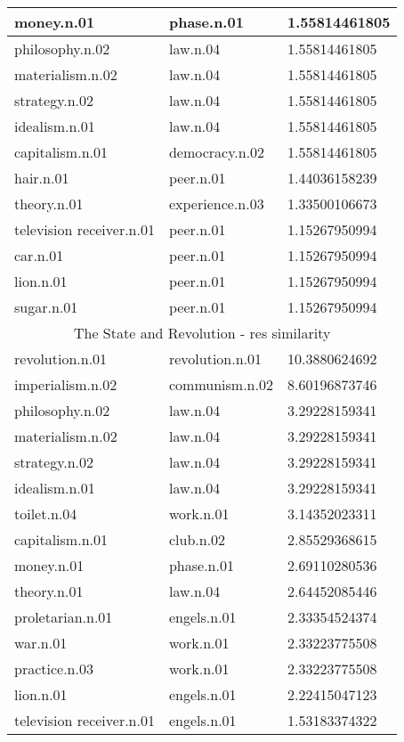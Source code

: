 \begin{center}
\begin{tabular}{ | l | l | l |}
money.n.01 & phase.n.01 & 1.55814461805 \\ \hline
philosophy.n.02 & law.n.04 & 1.55814461805 \\ \hline
materialism.n.02 & law.n.04 & 1.55814461805 \\ \hline
strategy.n.02 & law.n.04 & 1.55814461805 \\ \hline
idealism.n.01 & law.n.04 & 1.55814461805 \\ \hline
capitalism.n.01 & democracy.n.02 & 1.55814461805 \\ \hline
hair.n.01 & peer.n.01 & 1.44036158239 \\ \hline
theory.n.01 & experience.n.03 & 1.33500106673 \\ \hline
television receiver.n.01 & peer.n.01 & 1.15267950994 \\ \hline
car.n.01 & peer.n.01 & 1.15267950994 \\ \hline
lion.n.01 & peer.n.01 & 1.15267950994 \\ \hline
sugar.n.01 & peer.n.01 & 1.15267950994 \\ \hline
\multicolumn{3}{|c|}{The State and Revolution - res similarity} \\ \hline
revolution.n.01 & revolution.n.01 & 10.3880624692 \\ \hline
imperialism.n.02 & communism.n.02 & 8.60196873746 \\ \hline
philosophy.n.02 & law.n.04 & 3.29228159341 \\ \hline
materialism.n.02 & law.n.04 & 3.29228159341 \\ \hline
strategy.n.02 & law.n.04 & 3.29228159341 \\ \hline
idealism.n.01 & law.n.04 & 3.29228159341 \\ \hline
toilet.n.04 & work.n.01 & 3.14352023311 \\ \hline
capitalism.n.01 & club.n.02 & 2.85529368615 \\ \hline
money.n.01 & phase.n.01 & 2.69110280536 \\ \hline
theory.n.01 & law.n.04 & 2.64452085446 \\ \hline
proletarian.n.01 & engels.n.01 & 2.33354524374 \\ \hline
war.n.01 & work.n.01 & 2.33223775508 \\ \hline
practice.n.03 & work.n.01 & 2.33223775508 \\ \hline
lion.n.01 & engels.n.01 & 2.22415047123 \\ \hline
television receiver.n.01 & engels.n.01 & 1.53183374322 \\ \hline

\end{tabular}
\end{center}
